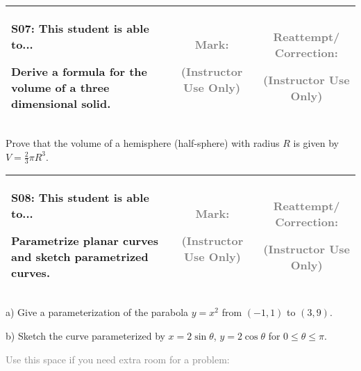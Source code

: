 \documentclass[12pt]{article}
\newcommand{\standardQuestion}[2]{
\newpage
\begin{center}
  \begin{tabular}{|l|c|c|}
  \hline
    \parbox{4in}{
      \textbf{#1}: This student is able to...\\
      #2
    }
  &
    \parbox{1in}{
      \vspace{0.1in}
      \footnotesize \textcolor{gray}{Mark:}
      \vspace{0.7in}

      \tiny \textcolor{gray}{(Instructor Use Only)}
    }
  &
    \parbox{1in}{
      \vspace{0.1in}
      \footnotesize \textcolor{gray}{Reattempt/ Correction:}
      \vspace{0.53in}

      \tiny \textcolor{gray}{(Instructor Use Only)}
    }
  \\\hline
  \end{tabular}
\end{center}
}
\begin{document}
\standardQuestion{S07}{
  Derive a formula for the volume of a three dimensional solid.
}

Prove that the volume of a hemisphere (half-sphere) with radius
\(R\) is given by \(V=\frac{2}{3}\pi R^3\).





\standardQuestion{S08}{
  Parametrize planar curves and sketch parametrized curves.
}

a) Give a parameterization of the parabola \(y=x^2\) from \((-1,1)\)
   to \((3,9)\).

\vfill

b) Sketch the curve parameterized by \(x=2\sin\theta\), \(y=2\cos\theta\) for
   \(0\leq\theta\leq\pi\).

\vfill







\newpage

\textcolor{gray}{Use this space if you need extra room for a problem:}
\end{document}
